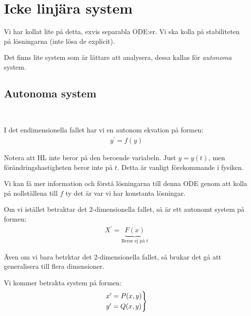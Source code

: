 \section{Icke linjära system}
\par\bigskip
\noindent Vi har kollat lite på detta, exvis separabla ODE:er. Vi ska kolla på stabiliteten på lösningarna (inte lösa de explicit).\par
\noindent Det finns lite system som är lättare att analysera, dessa kallas för \textit{autonoma} system.
\par\bigskip
\subsection{Autonoma system}\hfill\\
\par\bigskip
\noindent I det endimensionella fallet har vi en autonom ekvation på formen:
\begin{equation*}
  \begin{gathered}
    y^{\prime} = f(y)
  \end{gathered}
\end{equation*}
\par\bigskip
\noindent Notera att HL inte beror på den beroende variabeln. Just $y = y(t)$, men förändringshastigheten beror inte på $t$. Detta är vanligt förekommande i fysiken.\par
\noindent Vi kan få mer information och förstå lösningarna till denna ODE genom att kolla på nollställena till $f$ ty det är var vi har konstanta lösningar.
\par\bigskip
\noindent Om vi istället betraktar det 2-dimensionella fallet, så är ett autonomt system på formen:
\begin{equation*}
  \begin{gathered}
    X^{\prime} =\underbrace{F(x)}_{\text{Beror ej på $t$}} 
  \end{gathered}
\end{equation*}
\par\bigskip
\noindent Även om vi bara betrktar det 2-dimensionella fallet, så brukar det gå att generalisera till flera dimensioner.
\par\bigskip
\noindent Vi kommer betrakta system på formen:
\begin{equation*}
  \begin{gathered}
    \begin{rcases*}
      x^{\prime} = P(x,y)\\
      y^{\prime} = Q(x,y)
    \end{rcases*}
  \end{gathered}
\end{equation*}
